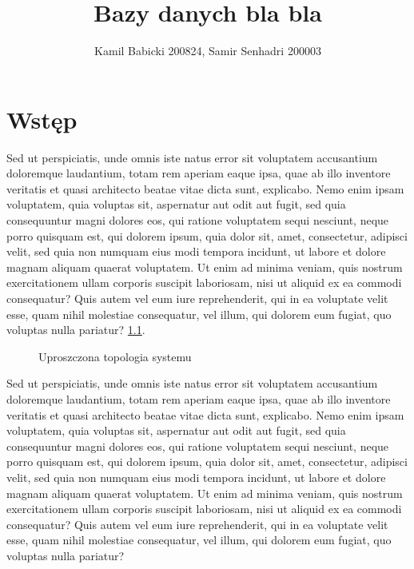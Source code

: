 \documentclass{mgr}
\title{Bazy danych bla bla}
\author{Kamil Babicki 200824, Samir Senhadri 200003}
\begin{document}

\maketitle %
\tableofcontents %



\chapter{Wstęp}
\setcounter{page}{5}
Sed ut perspiciatis, unde omnis iste natus error sit voluptatem accusantium doloremque laudantium, totam rem aperiam eaque ipsa, quae ab illo inventore veritatis et quasi architecto beatae vitae dicta sunt, explicabo. Nemo enim ipsam voluptatem, quia voluptas sit, aspernatur aut odit aut fugit, sed quia consequuntur magni dolores eos, qui ratione voluptatem sequi nesciunt, neque porro quisquam est, qui dolorem ipsum, quia dolor sit, amet, consectetur, adipisci velit, sed quia non numquam eius modi tempora incidunt, ut labore et dolore magnam aliquam quaerat voluptatem. Ut enim ad minima veniam, quis nostrum exercitationem ullam corporis suscipit laboriosam, nisi ut aliquid ex ea commodi consequatur? Quis autem vel eum iure reprehenderit, qui in ea voluptate velit esse, quam nihil molestiae consequatur, vel illum, qui dolorem eum fugiat, quo voluptas nulla pariatur? \ref{fig:schog}.
\begin{figure}[H]
\centering
\caption{Uproszczona topologia systemu}
\label{fig:schog}
\end{figure}
Sed ut perspiciatis, unde omnis iste natus error sit voluptatem accusantium doloremque laudantium, totam rem aperiam eaque ipsa, quae ab illo inventore veritatis et quasi architecto beatae vitae dicta sunt, explicabo. Nemo enim ipsam voluptatem, quia voluptas sit, aspernatur aut odit aut fugit, sed quia consequuntur magni dolores eos, qui ratione voluptatem sequi nesciunt, neque porro quisquam est, qui dolorem ipsum, quia dolor sit, amet, consectetur, adipisci velit, sed quia non numquam eius modi tempora incidunt, ut labore et dolore magnam aliquam quaerat voluptatem. Ut enim ad minima veniam, quis nostrum exercitationem ullam corporis suscipit laboriosam, nisi ut aliquid ex ea commodi consequatur? Quis autem vel eum iure reprehenderit, qui in ea voluptate velit esse, quam nihil molestiae consequatur, vel illum, qui dolorem eum fugiat, quo voluptas nulla pariatur?
\end{document}
